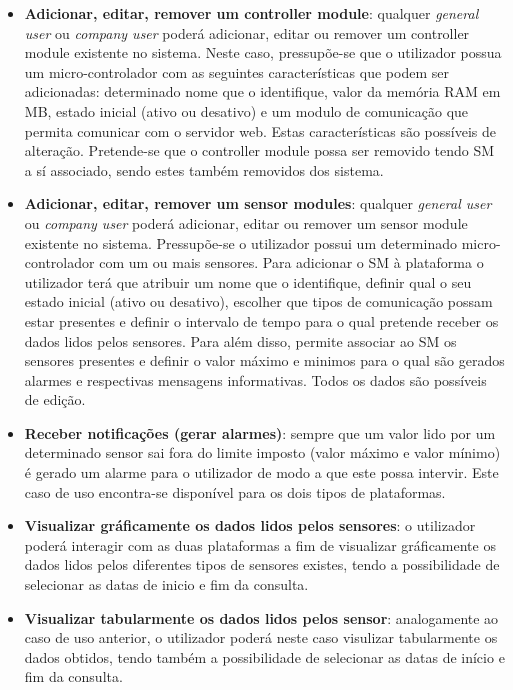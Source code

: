 \begin{itemize}
	
	\item \textbf{Adicionar, editar, remover um controller module}: qualquer \textit{general user} ou \textit{company user} poderá adicionar, editar ou remover um controller module existente no sistema. Neste caso, pressupõe-se que o utilizador possua um micro-controlador com as seguintes características que podem ser adicionadas: determinado nome que o identifique, valor da memória RAM em MB, estado inicial (ativo ou desativo) e um modulo de comunicação que permita comunicar com o servidor web. Estas características são possíveis de alteração. Pretende-se que o controller module possa ser removido tendo \ac{SM} a sí associado, sendo estes também removidos dos sistema. 


	\item \textbf{Adicionar, editar, remover um sensor modules}: qualquer \textit{general user} ou \textit{company user} poderá adicionar, editar ou remover um sensor module existente no sistema. Pressupõe-se o utilizador possui um determinado micro-controlador com um ou mais sensores. Para adicionar o \ac{SM} à plataforma o utilizador terá que atribuir um nome que o identifique, definir qual o seu estado inicial (ativo ou desativo), escolher que tipos de comunicação possam estar presentes e definir o intervalo de tempo para o qual pretende receber os dados lidos pelos sensores. Para além disso, permite associar ao \ac{SM} os sensores presentes e definir o valor máximo e minimos para o qual são gerados alarmes e respectivas mensagens informativas. Todos os dados são possíveis de edição.  
	

	
	\item \textbf{Receber notificações (gerar alarmes)}: sempre que um valor lido por um determinado sensor sai fora do limite imposto (valor máximo e valor mínimo) é gerado um alarme para o utilizador de modo a que este possa intervir. Este caso de uso encontra-se disponível para os dois tipos de plataformas. 
	
	
	\item \textbf{Visualizar gráficamente os dados lidos pelos sensores}: o utilizador poderá interagir com as duas plataformas a fim de visualizar gráficamente os dados lidos pelos diferentes tipos de sensores existes, tendo a possibilidade de selecionar as datas de inicio e fim da consulta. 
	
	\item \textbf{Visualizar tabularmente os dados lidos pelos sensor}: analogamente ao caso de uso anterior, o utilizador poderá neste caso visulizar tabularmente os dados obtidos, tendo também a possibilidade de selecionar as datas de início e fim da consulta.  
	

\end{itemize}
